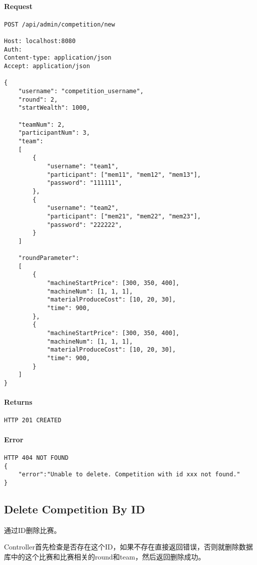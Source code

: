\documentclass{article}
\begin{document}
\paragraph*{Request}
\begin{lstlisting}
POST /api/admin/competition/new

Host: localhost:8080
Auth:
Content-type: application/json
Accept: application/json

{
    "username": "competition_username",
    "round": 2,
    "startWealth": 1000,

    "teamNum": 2,
    "participantNum": 3,
    "team":
    [
        {
            "username": "team1",
            "participant": ["mem11", "mem12", "mem13"],
            "password": "111111",
        },
        {
            "username": "team2",
            "participant": ["mem21", "mem22", "mem23"],
            "password": "222222",
        }
    ]

    "roundParameter":
    [
        {
            "machineStartPrice": [300, 350, 400],
            "machineNum": [1, 1, 1],
            "materialProduceCost": [10, 20, 30],
            "time": 900,
        },
        {
            "machineStartPrice": [300, 350, 400],
            "machineNum": [1, 1, 1],
            "materialProduceCost": [10, 20, 30],
            "time": 900,
        }
    ]
}
\end{lstlisting}

\paragraph*{Returns}
\begin{lstlisting}
HTTP 201 CREATED

\end{lstlisting}

\paragraph*{Error}
\begin{lstlisting}
HTTP 404 NOT FOUND
{
    "error":"Unable to delete. Competition with id xxx not found."
}
\end{lstlisting}


\subsection{Delete Competition By ID}

通过ID删除比赛。

Controller首先检查是否存在这个ID，如果不存在直接返回错误，否则就删除数据库中的这个比赛和比赛相关的round和team，然后返回删除成功。
\end{document}

